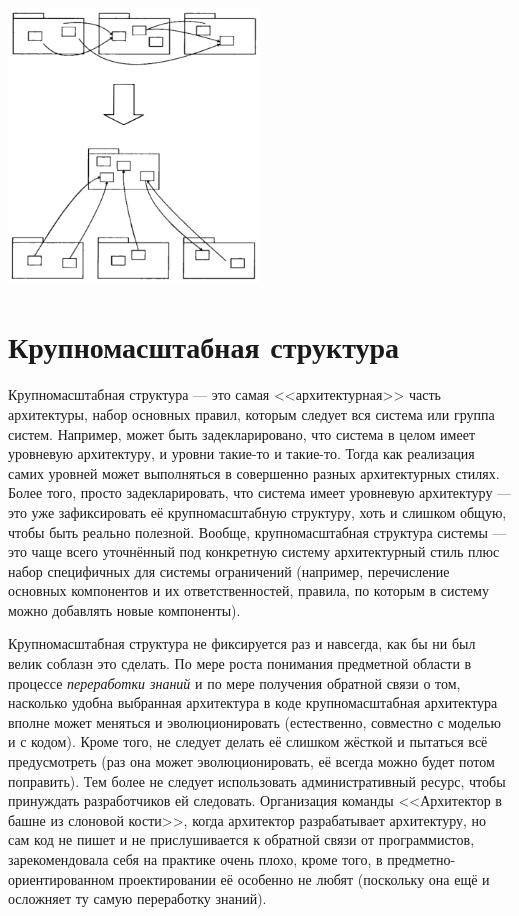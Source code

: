 \documentclass[a5paper]{article}
\begin{document}
\begin{center}
    \includegraphics[width=0.5\textwidth]{abstractCore.png}
\end{center}

\section{Крупномасштабная структура}

Крупномасштабная структура --- это самая <<архитектурная>> часть архитектуры, набор основных правил, которым следует вся система или группа систем. Например, может быть задекларировано, что система в целом имеет уровневую архитектуру, и уровни такие-то и такие-то. Тогда как реализация самих уровней может выполняться в совершенно разных архитектурных стилях. Более того, просто задекларировать, что система имеет уровневую архитектуру --- это уже зафиксировать её крупномасштабную структуру, хоть и слишком общую, чтобы быть реально полезной. Вообще, крупномасштабная структура системы --- это чаще всего уточнённый под конкретную систему архитектурный стиль плюс набор специфичных для системы ограничений (например, перечисление основных компонентов и их ответственностей, правила, по которым в систему можно добавлять новые компоненты).

Крупномасштабная структура не фиксируется раз и навсегда, как бы ни был велик соблазн это сделать. По мере роста понимания предметной области в процессе \textit{переработки знаний} и по мере получения обратной связи о том, насколько удобна выбранная архитектура в коде крупномасштабная архитектура вполне может меняться и эволюционировать (естественно, совместно с моделью и с кодом). Кроме того, не следует делать её слишком жёсткой и пытаться всё предусмотреть (раз она может эволюционировать, её всегда можно будет потом поправить). Тем более не следует использовать административный ресурс, чтобы принуждать разработчиков ей следовать. Организация команды <<Архитектор в башне из слоновой кости>>, когда архитектор разрабатывает архитектуру, но сам код не пишет и не прислушивается к обратной связи от программистов, зарекомендовала себя на практике очень плохо, кроме того, в предметно-ориентированном проектировании её особенно не любят (поскольку она ещё и осложняет ту самую переработку знаний).
\end{document}
